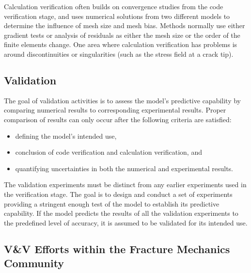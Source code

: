 Calculation verification often builds on convergence studies from the code verification stage, and uses numerical solutions from two different models to determine the influence of mesh size and mesh bias.
Methods normally use either gradient tests or analysis of residuals as either the mesh size or the order of the finite elements change.
One area where calculation verification has problems is around discontinuities or singularities (such as the stress field at a crack tip).

\subsection{Validation}

The goal of validation activities is to assess the model's predictive capability by comparing numerical results to corresponding experimental results.
Proper comparison of results can only occur after the following criteria are satisfied:
\begin{itemize}
\item defining the model's intended use,
\item conclusion of code verification and calculation verification, and
\item quantifying uncertainties in both the numerical and experimental results.
\end{itemize}
The validation experiments must be distinct from any earlier experiments used in the verification stage.
The goal is to design and conduct a set of experiments providing a stringent enough test of the model to establish its predictive capability.
If the model predicts the results of all the validation experiments to the predefined level of accuracy, it is assumed to be validated for its intended use.

\subsection{V\&V Efforts within the Fracture Mechanics Community}

